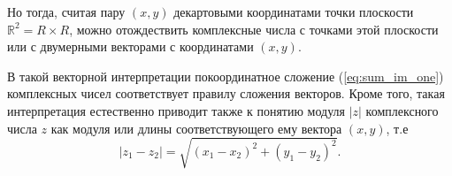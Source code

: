 \documentclass[a4paper, 12pt]{extarticle} %
\begin{document}
\begin{enumerate}
          Но тогда, считая пару $(x, y)$ декартовыми координатами точки плоскости $\mathbb{R}^2 = R \times R$, можно отождествить комплексные числа с точками этой плоскости или с двумерными векторами с координатами $(x, y)$.

          В такой векторной интерпретации покоординатное сложение (\ref{eq:sum_im_one}) комплексных чисел соответствует правилу сложения векторов. Кроме того, такая интерпретация естественно приводит также к понятию модуля $|z|$ комплексного числа $z$ как модуля или длины соответствующего ему вектора $(x, y)$, т.е
          \begin{equation}
              |z_1 - z_2| = \sqrt{(x_1 - x_2)^2 + (y_1 - y_2)^2}.
          \end{equation}
\end{enumerate}
\end{document}
